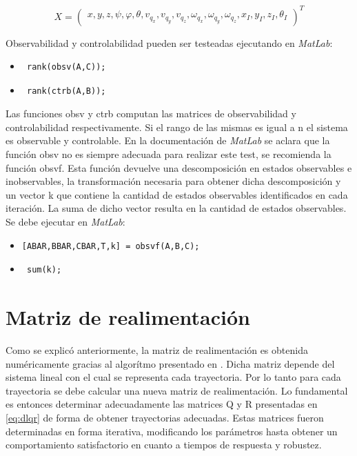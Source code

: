 \documentclass[main]{subfiles}
\begin{document}
\begin{equation}
\label{eq:controled}
X = \left(\begin{array}{c}
x,y,z,\psi,\varphi,\theta,v_{q_x},v_{q_y},v_{q_z},\omega_{q_x},\omega_{q_y},\omega_{q_z},x_I,y_I,z_I,\theta_I
\end{array}\right)^T
\end{equation}
  
Observabilidad y controlabilidad pueden ser testeadas ejecutando en \emph{MatLab}:
\begin{itemize}
\item \begin{verbatim} rank(obsv(A,C));
\end{verbatim} 
\item \begin{verbatim} rank(ctrb(A,B));
\end{verbatim}
\end{itemize}
Las funciones obsv y ctrb computan las matrices de observabilidad y controlabilidad respectivamente. Si el rango de las mismas es igual a n el sistema es observable y controlable. En la documentaci\'on de \emph{MatLab} se aclara que la funci\'on obsv no es siempre adecuada para realizar este test, se recomienda la funci\'on obsvf. Esta funci\'on devuelve una descomposici\'on en estados observables e inobservables, la transformaci\'on necesaria para obtener dicha descomposici\'on y un vector k que contiene la cantidad de estados observables identificados en cada iteraci\'on. La suma de dicho vector resulta en la cantidad de estados observables. Se debe ejecutar en \emph{MatLab}:
\vspace{-10pt}
\begin{itemize}
\item \begin{verbatim}[ABAR,BBAR,CBAR,T,k] = obsvf(A,B,C);
\end{verbatim}
\item \begin{verbatim} sum(k);
\end{verbatim}
\end{itemize}
\section{Matriz de realimentaci\'on}

Como se explic\'o anteriormente, la matriz de realimentaci\'on es obtenida num\'ericamente gracias al algor\'itmo presentado en \cite{bib:lqr-discreto}. Dicha matriz depende del sistema lineal con el cual se representa cada trayectoria. Por lo tanto para cada trayectoria se debe calcular una nueva matriz de realimentaci\'on. Lo fundamental es entonces determinar adecuadamente las matrices Q y R presentadas en \ref{eq:dlqr} de forma de obtener trayectorias adecuadas. Estas matrices fueron determinadas en forma iterativa, modificando los par\'ametros hasta obtener un comportamiento satisfactorio en cuanto a tiempos de respuesta y robustez.\\
\end{document}
